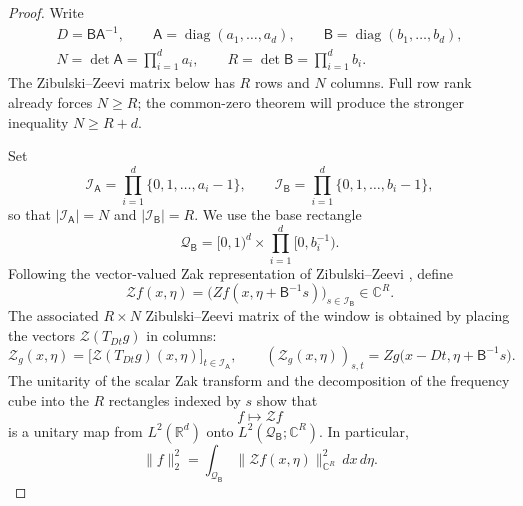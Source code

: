 \documentclass[11pt,reqno]{amsart}
\numberwithin{equation}{section}
\theoremstyle{definition}
\theoremstyle{remark}
\newcommand{\R}{\mathbb R}
\newcommand{\C}{\mathbb C}
\begin{document}
\begin{proof}
Write
\begin{equation}\label{eq:zak-D-data}
 \begin{gathered}
 D=\mathsf B\mathsf A^{-1},
 \qquad
 \mathsf A=\operatorname{diag}(a_1,\ldots,a_d),
 \qquad
 \mathsf B=\operatorname{diag}(b_1,\ldots,b_d),\\
 N=\det\mathsf A=\prod_{i=1}^d a_i,
 \qquad
 R=\det\mathsf B=\prod_{i=1}^d b_i.
 \end{gathered}
\end{equation}
The Zibulski--Zeevi matrix below has $R$ rows and $N$ columns.  Full row rank
already forces $N\ge R$; the common-zero theorem will produce the stronger
inequality $N\ge R+d$.

Set
\begin{equation}\label{eq:zak-index-sets}
 \mathcal I_{\mathsf A}
   =\prod_{i=1}^d\{0,1,\ldots,a_i-1\},
 \qquad
 \mathcal I_{\mathsf B}
   =\prod_{i=1}^d\{0,1,\ldots,b_i-1\},
\end{equation}
so that $|\mathcal I_{\mathsf A}|=N$ and
$|\mathcal I_{\mathsf B}|=R$.  We use the base rectangle
\begin{equation}\label{eq:zak-base-rectangle}
 \mathcal Q_{\mathsf B}
  =[0,1)^d\times\prod_{i=1}^d[0,b_i^{-1}).
\end{equation}
Following the vector-valued Zak representation of
Zibulski--Zeevi \cite{ZibulskiZeevi1997}, define
\begin{equation}\label{eq:zz-vector-transform}
 \mathcal Zf(x,\eta)
 =\bigl(Zf(x,\eta+\mathsf B^{-1}s)\bigr)_{s\in\mathcal I_{\mathsf B}}
 \in\C^R.
\end{equation}
The associated $R\times N$ Zibulski--Zeevi matrix of the window is obtained
by placing the vectors $\mathcal Z(T_{Dt}g)$ in columns:
\begin{equation}\label{eq:zak-H-definition}
 \mathcal Z_g(x,\eta)
 =\bigl[\mathcal Z(T_{Dt}g)(x,\eta)\bigr]_{t\in\mathcal I_{\mathsf A}},
 \qquad
 (\mathcal Z_g(x,\eta))_{s,t}
 =Zg\bigl(x-Dt,\eta+\mathsf B^{-1}s\bigr).
\end{equation}
The unitarity of the scalar Zak transform and the decomposition of the
frequency cube into the $R$ rectangles indexed by $s$ show that
\[
 f\longmapsto\mathcal Zf
\]
is a unitary map from $L^2(\R^d)$ onto
$L^2(\mathcal Q_{\mathsf B};\C^R)$.  In particular,
\begin{equation}\label{eq:zak-fiber-norm}
 \|f\|_2^2
   =\int_{\mathcal Q_{\mathsf B}}
        \|\mathcal Zf(x,\eta)\|_{\C^R}^2\,dx\,d\eta.
\end{equation}


\end{proof}
\end{document}

